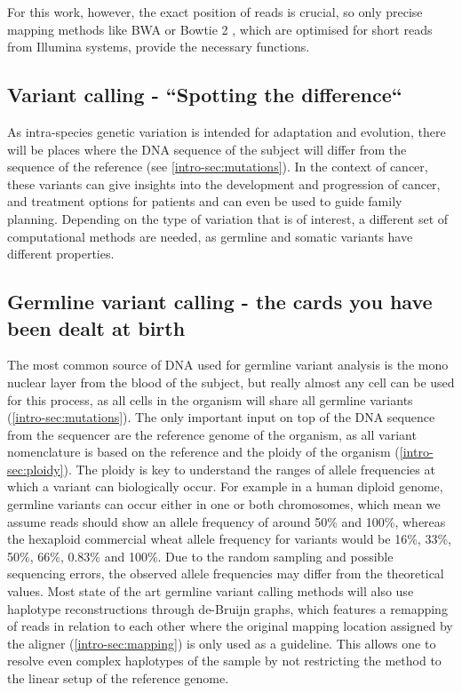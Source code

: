 For this work, however, the exact position of reads is crucial, so only precise mapping methods like BWA \cite{Li2013} or Bowtie 2 \cite{Langmead2018}, which are optimised for short reads from Illumina systems, provide the necessary functions.


\subsection[Variant calling]{Variant calling - ``Spotting the difference``}
\label{intro-sec:variantcalling}
As intra-species genetic variation is intended for adaptation and evolution, there will be places where the DNA sequence of the subject will differ from the sequence of the reference (see \autoref{intro-sec:mutations}). In the context of cancer, these variants can give insights into the development and progression of cancer, and treatment options for patients and can even be used to guide family planning. Depending on the type of variation that is of interest, a different set of computational methods are needed, as germline and somatic variants have different properties.

\subsection[Germline]{Germline variant calling - the cards you have been dealt at birth}
\label{intro-sec:germlinecalling}
The most common source of DNA used for germline variant analysis is the mono nuclear layer from the blood of the subject, but really almost any cell can be used for this process, as all cells in the organism will share all germline variants (\autoref{intro-sec:mutations}). The only important input on top of the DNA sequence from the sequencer are the reference genome of the organism, as all variant nomenclature is based on the reference and the ploidy of the organism (\autoref{intro-sec:ploidy}). The ploidy is key to understand the ranges of allele frequencies at which a variant can biologically occur. For example in a human diploid genome, germline variants can occur either in one or both chromosomes, which mean we assume reads should show an allele frequency of around 50\% and 100\%, whereas the hexaploid commercial wheat \cite{Mayer2014} allele frequency for variants would be 16\%, 33\%, 50\%, 66\%, 0.83\% and 100\%. Due to the random sampling and possible sequencing errors, the observed allele frequencies may differ from the theoretical values. 
Most state of the art germline variant calling methods will also use haplotype reconstructions through de-Bruijn graphs, which features a remapping of reads in relation to each other \cite{Garrison2012,Lai2016,Kim2018,Benjamin2019,Cooke2021} where the original mapping location assigned by the aligner (\autoref{intro-sec:mapping}) is only used as a guideline. This allows one to resolve even complex haplotypes of the sample by not restricting the method to the linear setup of the reference genome.


